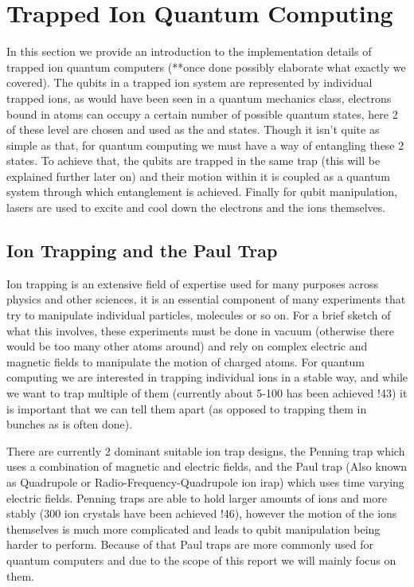 
\section{Trapped Ion Quantum Computing} \label{sec:Trapped}
In this section we provide an introduction to the implementation details of trapped ion quantum computers (**once done possibly elaborate what exactly we covered).
The qubits in a trapped ion system are represented by individual trapped ions, as would have been seen in a quantum mechanics class, electrons bound in atoms can occupy a certain number of possible quantum states, here 2 of these level are chosen and used as the \kz and \ko states.
Though it isn't quite as simple as that, for quantum computing we must have a way of entangling these 2 states.
To achieve that, the qubits are trapped in the same trap (this will be explained further later on) and their motion within it is coupled as a quantum system through which entanglement is achieved.
Finally for qubit manipulation, lasers are used to excite and cool down the electrons and the ions themselves.

\subsection{Ion Trapping and the Paul Trap}
Ion trapping is an extensive field of expertise used for many purposes across physics and other sciences, it is an essential component of many experiments that try to manipulate individual particles, molecules or so on.
For a brief sketch of what this involves, these experiments must be done in vacuum (otherwise there would be too many other atoms around) and rely on complex electric and magnetic fields to manipulate the motion of charged atoms.
For quantum computing we are interested in trapping individual ions in a stable way, and while we want to trap multiple of them (currently about 5-100 has been achieved !43) it is important that we can tell them apart (as opposed to trapping them in bunches as is often done).

There are currently 2 dominant suitable ion trap designs, the Penning trap which uses a combination of magnetic and electric fields, and the Paul trap (Also known as Quadrupole or Radio-Frequency-Quadrupole ion irap) which uses time varying electric fields.
Penning traps are able to hold larger amounts of ions and more stably (300 ion crystals have been achieved !46), however the motion of the ions themselves is much more complicated and leads to qubit manipulation being harder to perform.
Because of that Paul traps are more commonly used for quantum computers and due to the scope of this report we will mainly focus on them.

